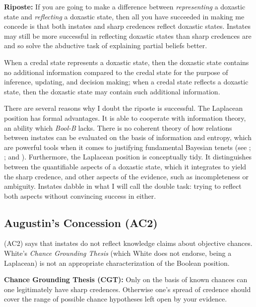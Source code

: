 \documentclass[11pt]{article}
\newcommand{\augustin}[0]{\textit{Bool-B}}
\begin{document}
\begin{quotex}
  \textbf{Riposte:} If you are going to make a difference between
  \emph{representing} a doxastic state and \emph{reflecting} a
  doxastic state, then all you have succeeded in making me concede is
  that both instates and sharp credences reflect doxastic states.
  Instates may still be more successful in reflecting doxastic states
  than sharp credences are and so solve the abductive task of
  explaining partial beliefs better. 
\end{quotex}

When a credal state represents a doxastic state, then the doxastic
state contains no additional information compared to the credal state
for the purpose of inference, updating, and decision making; when a
credal state reflects a doxastic state, then the doxastic state may
contain such additional information.

There are several reasons why I doubt the riposte is successful. The
Laplacean position has formal advantages. It is able to cooperate with
information theory, an ability which {\augustin} lacks. There is no
coherent theory of how relations between instates can be evaluated on
the basis of information and entropy, which are powerful tools when it
comes to justifying fundamental Bayesian tenets (see
; ; and
). Furthermore, the Laplacean position is
conceptually tidy. It distinguishes between the quantifiable aspects
of a doxastic state, which it integrates to yield the sharp credence,
and other aspects of the evidence, such as incompleteness or
ambiguity. Instates dabble in what I will call the double task: trying
to reflect both aspects without convincing success in either.

\subsection{Augustin's Concession (AC2)}
\label{jj2}

(AC2) says that instates do not reflect knowledge claims about
objective chances. White's \emph{Chance Grounding Thesis} (which White
does not endorse, being a Laplacean) is not an appropriate
characterization of the Boolean position.

\begin{quotex}
  \textbf{Chance Grounding Thesis (CGT):} Only on the basis of known
  chances can one legitimately have sharp credences. Otherwise one's
  spread of credence should cover the range of possible chance
  hypotheses left open by your evidence.
\end{quotex}
\end{document}
